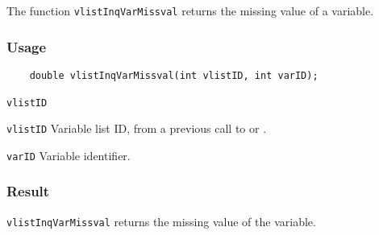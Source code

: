 The function {\texttt{vlistInqVarMissval}} returns the missing value of a variable.

\subsubsection*{Usage}

\begin{verbatim}
    double vlistInqVarMissval(int vlistID, int varID);
\end{verbatim}

\hspace*{4mm}\begin{minipage}[]{15cm}
\begin{deflist}{\texttt{vlistID}\ }
\item[\texttt{vlistID}]
Variable list ID, from a previous call to {} or {}.
\item[\texttt{varID}]
Variable identifier.

\end{deflist}
\end{minipage}

\subsubsection*{Result}

{\texttt{vlistInqVarMissval}} returns the missing value of the variable.

